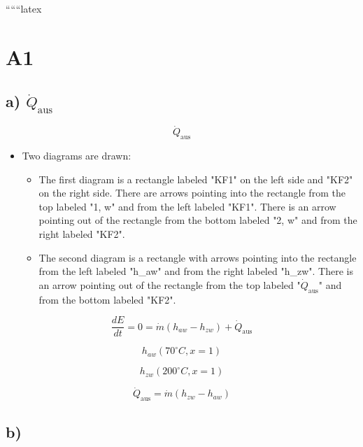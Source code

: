 
``````latex


\section*{A1}

\subsection*{a) $\dot{Q}_{\text{aus}}$}

\begin{equation*}
\dot{Q}_{\text{aus}}
\end{equation*}

\begin{itemize}
    \item Two diagrams are drawn:
    \begin{itemize}
        \item The first diagram is a rectangle labeled "KF1" on the left side and "KF2" on the right side. There are arrows pointing into the rectangle from the top labeled "1, w" and from the left labeled "KF1". There is an arrow pointing out of the rectangle from the bottom labeled "2, w" and from the right labeled "KF2".
        \item The second diagram is a rectangle with arrows pointing into the rectangle from the left labeled "h_{aw}" and from the right labeled "h_{zw}". There is an arrow pointing out of the rectangle from the top labeled "$\dot{Q}_{\text{aus}}$" and from the bottom labeled "KF2".
    \end{itemize}
\end{itemize}

\begin{equation*}
\frac{dE}{dt} = 0 = \dot{m} (h_{aw} - h_{zw}) + \dot{Q}_{\text{aus}}
\end{equation*}

\begin{equation*}
h_{aw} (70^\circ C, x = 1)
\end{equation*}

\begin{equation*}
h_{zw} (200^\circ C, x = 1)
\end{equation*}

\begin{equation*}
\dot{Q}_{\text{aus}} = \dot{m} (h_{zw} - h_{aw})
\end{equation*}

\subsection*{b)}


